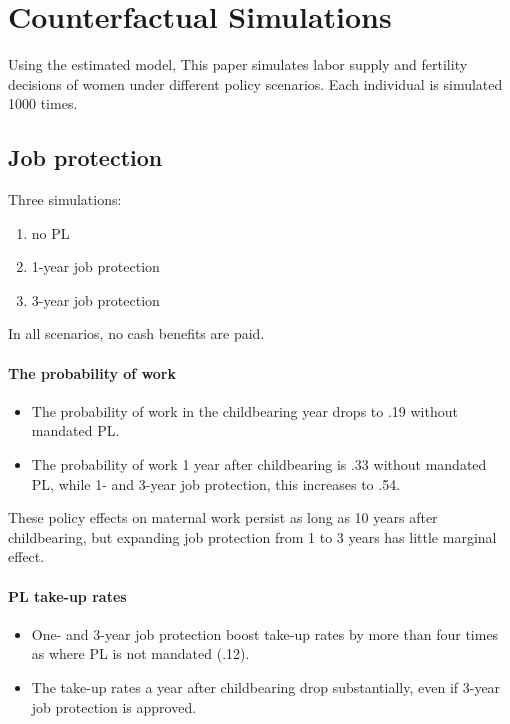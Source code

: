 \documentclass[../root]{subfiles}
\begin{document}
    \section{Counterfactual Simulations}

    Using the estimated model, This paper simulates labor supply and fertility decisions of women under different policy scenarios. Each individual is simulated 1000 times.

    \subsection{Job protection}

    Three simulations:
    \begin{enumerate}
      \item no PL
      \item 1-year job protection
      \item 3-year job protection
    \end{enumerate}
    In all scenarios, no cash benefits are paid.

    \paragraph{The probability of work}

    \begin{itemize}
      \item The probability of work in the childbearing year drops to .19 without mandated PL.
      \item The probability of work 1 year after childbearing is .33 without mandated PL, while 1- and 3-year job protection, this increases to .54.
    \end{itemize}
    These policy effects on maternal work persist as long as 10 years after childbearing, but expanding job protection from 1 to 3 years has little marginal effect.

    \paragraph{PL take-up rates}

    \begin{itemize}
      \item One- and 3-year job protection boost take-up rates by more than four times as where PL is not mandated (.12).
      \item The take-up rates a year after childbearing drop substantially, even if 3-year job protection is approved.
    \end{itemize}
\end{document}
